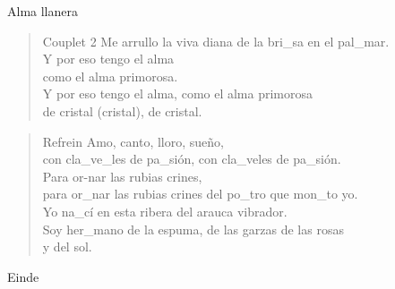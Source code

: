 \begin{song}[joropo]{Alma llanera}
\begin{verse}{Couplet 2}
Me arrullo la viva diana de la bri\_sa en el   pal\_mar.  \hspace{1em} \hspace{1em}  \hspace{1em}\\
  Y por eso tengo el alma  \hspace{1em} \hspace{1em}  \hspace{1em}\\
  como el alma primorosa.  \hspace{1em} \hspace{1em}  \hspace{1em}\\
  Y por eso tengo el alma, como el alma primorosa\\
de cristal (cristal), de cristal.  \\
\end{verse}

\begin{verse}{Refrein}
\chord{-}Amo, canto, lloro, sueño,\chord{}\\
con cla\_ve\_les de pa\_sión, con cla\_veles de pa\_sión.\\
\chord{-}Para or-nar las rubias crines,\\
para or\_nar las rubias crines del po\_tro que mon\_to yo.\\
Yo na\_cí en esta ribera del arauca vibrador.\\
Soy her\_mano de la espuma, de las garzas de las rosas   \\
y del sol.
\end{verse}

\begin{instrumental}{Einde}
               
\end{instrumental}
\end{song}

